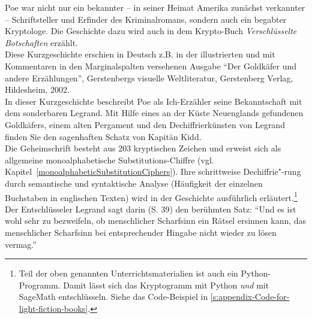 \begin{refsegment}
\begin{description}
{	Poe war nicht nur ein bekannter -- in seiner Heimat Amerika zunächst
	verkannter -- Schriftsteller und Erfinder des Kriminalromans,
	sondern auch ein begabter Kryptologe. Die Geschichte dazu wird auch in dem
	Krypto-Buch {\em Verschlüsselte Botschaften} \cite{Kippenhahn1997}
	erzählt.
    }\\
    Diese Kurzgeschichte erschien in Deutsch z.B. in der illustrierten und
    mit Kommentaren in den Marginalspalten versehenen Ausgabe "`Der Goldkäfer
    und andere Erzählungen"', Gerstenbergs visuelle Weltliteratur,
    Gerstenberg Verlag, Hildesheim, 2002.\\
    In dieser Kurzgeschichte beschreibt Poe als Ich-Erzähler seine
    Bekanntschaft mit dem sonderbaren Legrand. Mit Hilfe eines an der
    Küste Neuenglands gefundenen Goldkäfers, einem alten Pergament und
    den Dechiffrierkünsten von Legrand finden Sie den sagenhaften Schatz
    von Kapitän Kidd.\\
    Die Geheimschrift besteht aus 203 kryptischen Zeichen und erweist sich
    als allgemeine monoalphabetische Substitutions-Chiffre (vgl.
    Kapitel~\ref{monoalphabeticSubstitutionCiphers}). Ihre schrittweise
    Dechiffrie"-rung durch semantische und syntaktische Analyse
    (Häufigkeit der einzelnen Buchstaben in englischen Texten)
    wird in der Geschichte ausführlich erläutert.\footnote{%
      Teil der oben genannten Unterrichtsmaterialien ist auch ein Python-Programm.
      Damit lässt sich das Kryptogramm mit Python {\em und} mit SageMath
      entschlüsseln.
      Siehe das Code-Beispiel in \ref{s:appendix-Code-for-light-fiction-books}.
    }\\
    Der Entschlüsseler Legrand sagt darin (S. 39) den berühmten Satz:
    "`Und es ist wohl sehr zu bezweifeln, ob menschlicher Scharfsinn
    ein Rätsel ersinnen kann, das menschlicher Scharfsinn bei
    entsprechender Hingabe nicht wieder zu lösen vermag."'\\



\end{description}
\end{refsegment}
